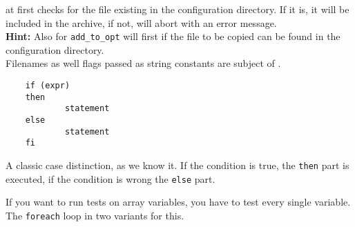      at first checks for the file existing
    in the configuration directory. If it is, it will be included in the archive,
    if not,  will abort with an error message.\\

    \textbf{Hint:} Also for \texttt{add\_to\_opt}  will first
     if the file to be copied can be found
    in the configuration directory.\\

    Filenames as well flags passed as string constants are subject of
    .


\begin{example}
\begin{verbatim}
    if (expr)
    then
            statement
    else
            statement
    fi
\end{verbatim}
\end{example}

    A classic case distinction, as we know it. If the condition is true,
    the \texttt{then} part is executed, if the condition is wrong the \texttt{else} part.

    If you want to run tests on array variables, you have to test every single
    variable. The \texttt{foreach} loop in two variants for this.

